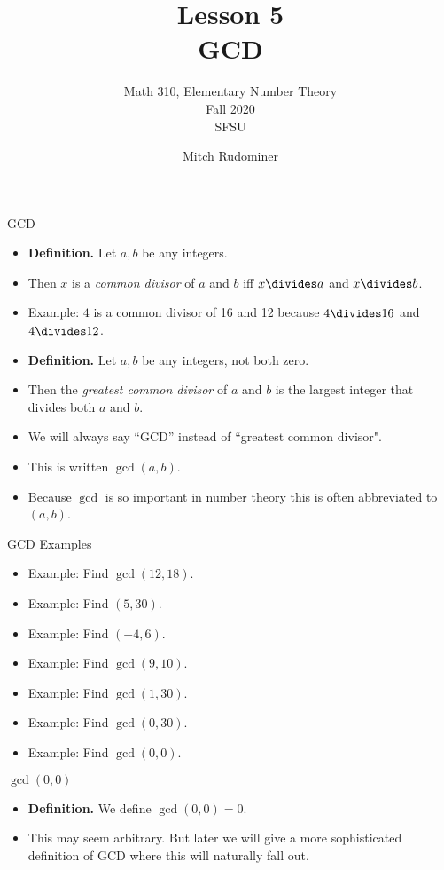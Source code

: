 \documentclass{beamer}
\title{Lesson 5 \\ GCD}
\subtitle{Math 310, Elementary Number Theory \\ Fall 2020 \\ SFSU}
\author{Mitch Rudominer}
\date{}
\begin{document}
\begin{frame}
  \titlepage
\end{frame}


\begin{frame}{GCD}

\begin{itemize}
  \item \textbf{Definition.} Let $a,b$ be any integers.
  \item Then $x$ is a \emph{common divisor} of $a$ and $b$ iff $x\divides a$ and $x\divides b$.
  \item Example: $4$ is a common divisor of 16 and 12 because $4\divides 16$ and $4\divides 12$.
\end{itemize}

\begin{itemize}
  \item \textbf{Definition.} Let $a,b$ be any integers, not both zero.
  \item Then the \emph{greatest common divisor} of $a$ and $b$ is the largest integer that divides both $a$ and $b$.
  \item We will always say ``GCD'' instead of ``greatest common divisor".
  \item This is written $\gcd(a,b)$.
  \item Because $\gcd$ is so important in number theory this is often abbreviated to $(a,b)$.
\end{itemize}

\end{frame}

\begin{frame}{GCD Examples}

\begin{itemize}
  \item Example: Find $\gcd(12,18)$.
  \item Example: Find $(5, 30)$.
  \item Example: Find $(-4, 6)$.
  \item Example: Find $\gcd(9, 10)$.
  \item Example: Find $\gcd(1, 30)$.
  \item Example: Find $\gcd(0,30)$.
  \item Example: Find $\gcd(0,0)$.
\end{itemize}

\end{frame}

\begin{frame}{$\gcd(0,0)$}

\begin{itemize}
  \item \textbf{Definition.} We define $\gcd(0,0)=0$.
  \item This may seem arbitrary. But later we will give a more
  sophisticated definition of GCD where this will naturally fall out.
\end{itemize}

\end{frame}
\end{document}
